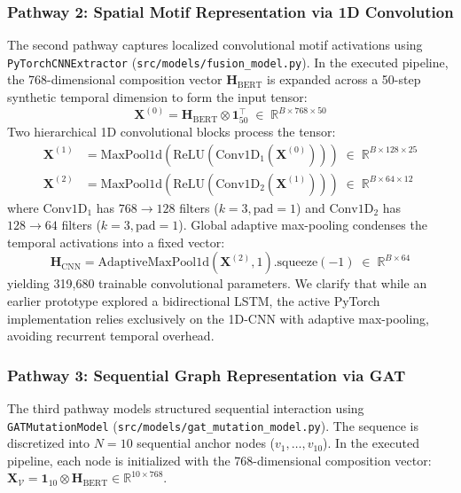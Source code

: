 \documentclass[conference]{IEEEtran}
\begin{document}
\subsubsection{Pathway 2: Spatial Motif Representation via 1D Convolution}
The second pathway captures localized convolutional motif activations using \texttt{PyTorchCNNExtractor} (\texttt{src/models/fusion_model.py}). In the executed pipeline, the 768-dimensional composition vector $\mathbf{H}_{\text{BERT}}$ is expanded across a 50-step synthetic temporal dimension to form the input tensor:
\begin{equation}
    \mathbf{X}^{(0)} = \mathbf{H}_{\text{BERT}} \otimes \mathbf{1}_{50}^{\top} \;\in\; \mathbb{R}^{B \times 768 \times 50}
    \label{eq:cnn_expand}
\end{equation}
Two hierarchical 1D convolutional blocks process the tensor:
\begin{align}
    \mathbf{X}^{(1)} &= \text{MaxPool1d}(\text{ReLU}(\text{Conv1D}_1(\mathbf{X}^{(0)}))) \;\in\; \mathbb{R}^{B \times 128 \times 25} \label{eq:conv1_pool} \\
    \mathbf{X}^{(2)} &= \text{MaxPool1d}(\text{ReLU}(\text{Conv1D}_2(\mathbf{X}^{(1)}))) \;\in\; \mathbb{R}^{B \times 64 \times 12} \label{eq:conv2_pool}
\end{align}
where $\text{Conv1D}_1$ has $768 \to 128$ filters ($k=3, \text{pad}=1$) and $\text{Conv1D}_2$ has $128 \to 64$ filters ($k=3, \text{pad}=1$). Global adaptive max-pooling condenses the temporal activations into a fixed vector:
\begin{equation}
    \mathbf{H}_{\text{CNN}} = \text{AdaptiveMaxPool1d}\left(\mathbf{X}^{(2)}, 1\right).\text{squeeze}(-1) \;\in\; \mathbb{R}^{B \times 64}
    \label{eq:cnn_pool}
\end{equation}
yielding 319,680 trainable convolutional parameters. We clarify that while an earlier prototype explored a bidirectional LSTM, the active PyTorch implementation relies exclusively on the 1D-CNN with adaptive max-pooling, avoiding recurrent temporal overhead.

\subsubsection{Pathway 3: Sequential Graph Representation via GAT}
The third pathway models structured sequential interaction using \texttt{GATMutationModel} (\texttt{src/models/gat_mutation_model.py}). The sequence is discretized into $N = 10$ sequential anchor nodes ($v_1, \dots, v_{10}$). In the executed pipeline, each node is initialized with the 768-dimensional composition vector: $\mathbf{X}_{\mathcal{V}} = \mathbf{1}_{10} \otimes \mathbf{H}_{\text{BERT}} \in \mathbb{R}^{10 \times 768}$.
\end{document}

